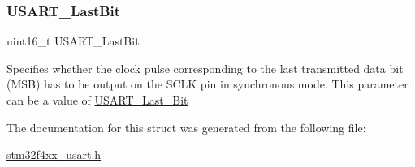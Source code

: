 \subsubsection{\texorpdfstring{U\+S\+A\+R\+T\+\_\+\+Last\+Bit}{USART\_LastBit}}
{\footnotesize\ttfamily uint16\+\_\+t U\+S\+A\+R\+T\+\_\+\+Last\+Bit}

Specifies whether the clock pulse corresponding to the last transmitted data bit (M\+SB) has to be output on the S\+C\+LK pin in synchronous mode. This parameter can be a value of \mbox{\hyperlink{group___u_s_a_r_t___last___bit}{U\+S\+A\+R\+T\+\_\+\+Last\+\_\+\+Bit}} 

The documentation for this struct was generated from the following file\+:\begin{DoxyCompactItemize}
\item 
\mbox{\hyperlink{stm32f4xx__usart_8h}{stm32f4xx\+\_\+usart.\+h}}\end{DoxyCompactItemize}

